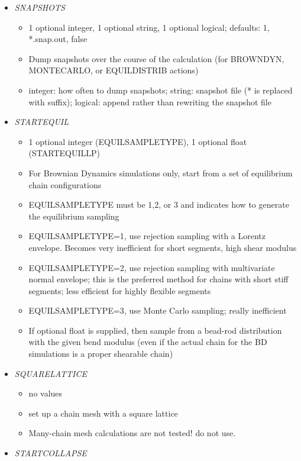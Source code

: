 \documentclass[12pt]{article}
\begin{document}
\begin{itemize}
\begin{itemize}
   \end{itemize}
%
\item {\it SNAPSHOTS}
  \begin{itemize}
    \item 1 optional integer, 1 optional string, 1 optional logical; defaults: 1, *.snap.out, false 
    \item Dump snapshots over the course of the calculation (for BROWNDYN, MONTECARLO, or EQUILDISTRIB actions)
    \item integer: how often to dump snapshots; string: snapshot file (* is replaced with suffix); logical: append rather than rewriting the snapshot file
   \end{itemize}
%
\item {\it STARTEQUIL}
  \begin{itemize}
    \item 1 optional integer (EQUILSAMPLETYPE), 1 optional float (STARTEQUILLP)
    \item For Brownian Dynamics simulations only, start from a set of equilibrium chain configurations
    \item EQUILSAMPLETYPE must be 1,2, or 3 and indicates how to generate the equilibrium sampling
    \item EQUILSAMPLETYPE=1, use rejection sampling with a Lorentz envelope. Becomes very inefficient for short segments, high shear modulus
    \item EQUILSAMPLETYPE=2, use rejection sampling with multivariate normal envelope; this is the preferred method for chains with short stiff segments; less efficient for highly flexible segments
    \item EQUILSAMPLETYPE=3, use Monte Carlo sampling; really inefficient
    \item If optional float is supplied, then sample from a bead-rod distribution with the given bend modulus (even if the actual chain for the BD simulations is a proper shearable chain)
   \end{itemize}
%
\item {\it SQUARELATTICE}
  \begin{itemize}
    \item no values
    \item set up a chain mesh with a square lattice
    \item {\color{red} Many-chain mesh calculations are not tested! do not use.}
   \end{itemize}
%
\item {\it STARTCOLLAPSE}
  \begin{itemize}

\end{itemize}
\end{itemize}
\end{document}
